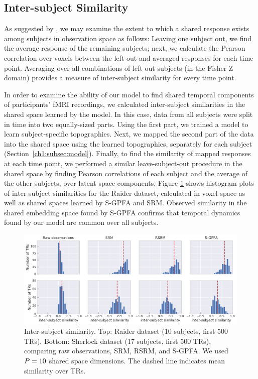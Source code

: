 \subsection{Inter-subject Similarity}

As suggested by \cite{srm}, we may examine the extent to which a shared response exists among subjects in observation space as follows: Leaving one subject out, we find the average response of the remaining subjects; next, we calculate the Pearson correlation over voxels between the left-out and averaged responses for each time point. Averaging over all combinations of left-out subjects (in the Fisher Z domain) provides a measure of inter-subject similarity for every time point.

In order to examine the ability of our model to find shared temporal components of participants' fMRI recordings, we calculated inter-subject similarities in the shared space learned by the model. In this case, data from all subjects were split in time into two equally-sized parts. Using the first part, we trained a model to learn subject-specific topographies. Next, we mapped the second part of the data into the shared space using the learned topographies, separately for each subject (Section~\ref{ch1:subsec:model}). Finally, to find the similarity of mapped responses at each time point, we performed a similar leave-subject-out procedure in the shared space by finding Pearson correlations of each subject and the average of the other subjects, over latent space components. Figure \ref{ch1:fig:isc} shows histogram plots of inter-subject similarities for the Raider dataset, calculated in voxel space as well as shared spaces learned by S-GPFA and SRM. Observed similarity in the shared embedding space found by S-GPFA confirms that temporal dynamics found by our model are common over all subjects.

\begin{figure}[h]
    \centering
    \includegraphics[width=\linewidth]{figs/ch1/isc_3.pdf}
    \caption{Inter-subject similarity. Top: Raider dataset (10 subjects, first 500 TRs). Bottom: Sherlock dataset (17 subjects, first 500 TRs), comparing raw observations, SRM, RSRM, and S-GPFA. We used $P=10$ shared space dimensions. The dashed line indicates mean similarity over TRs.}\label{ch1:fig:isc}
\end{figure}

